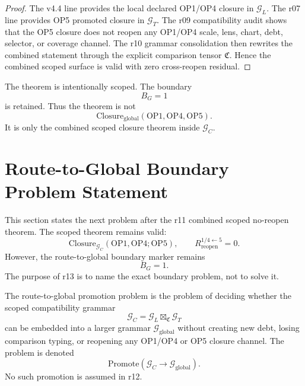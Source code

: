 \begin{proof}
The v4.4 line provides the local declared OP1/OP4 closure in
\(\mathcal G_L\).  The r07 line provides OP5 promoted closure in
\(\mathcal G_T\).  The r09 compatibility audit shows that the OP5 closure
does not reopen any OP1/OP4 scale, lens, chart, debt, selector, or coverage
channel.  The r10 grammar consolidation then rewrites the combined statement
through the explicit comparison tensor \(\mathfrak C\).  Hence the combined
scoped surface is valid with zero cross-reopen residual.
\end{proof}

\begin{remark}
The theorem is intentionally scoped.  The boundary
\[
    B_G=1
\]
is retained.  Thus the theorem is not
\[
    \mathrm{Closure}_{\mathrm{global}}(\mathrm{OP1},\mathrm{OP4},\mathrm{OP5}).
\]
It is only the combined scoped closure theorem inside \(\mathcal G_C\).
\end{remark}



\section{Route-to-Global Boundary Problem Statement}
\label{sec:v450-r12-route-to-global-boundary-problem-statement}

This section states the next problem after the r11 combined scoped no-reopen
theorem.  The scoped theorem remains valid:
\[
    \mathrm{Closure}_{\mathcal G_C}(\mathrm{OP1},\mathrm{OP4};\mathrm{OP5}),
    \qquad
    R_{\mathrm{reopen}}^{1/4\leftarrow 5}=0.
\]
However, the route-to-global boundary marker remains
\[
    B_G=1.
\]
The purpose of r13 is to name the exact boundary problem, not to solve it.

\begin{definition}
The route-to-global promotion problem is the problem of deciding whether the
scoped compatibility grammar
\[
    \mathcal G_C
    =
    \mathcal G_L \boxtimes_{\mathfrak C} \mathcal G_T
\]
can be embedded into a larger grammar \(\mathcal G_{\mathrm{global}}\) without
creating new debt, losing comparison typing, or reopening any OP1/OP4 or OP5
closure channel.  The problem is denoted
\[
    \mathrm{Promote}(\mathcal G_C\to \mathcal G_{\mathrm{global}}).
\]
No such promotion is assumed in r12.
\end{definition}

